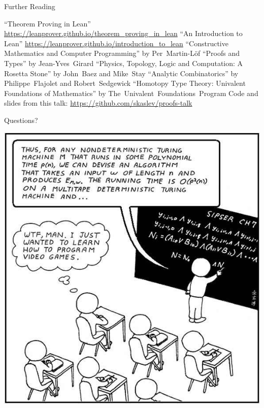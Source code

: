 \documentclass[pdf]{beamer}
\begin{document}
\begin{frame}{Further Reading}
  \small
  \begin{outline}
    \1 ``Theorem Proving in Lean'' \url{https://leanprover.github.io/theorem_proving_in_lean}
    \1 ``An Introduction to Lean'' \url{https://leanprover.github.io/introduction_to_lean}
    \1 ``Constructive Mathematics and Computer Programming'' by \mbox{Per Martin-L\"{o}f}
    \1 ``Proofs and Types'' by \mbox{Jean-Yves Girard}
    \1 ``Physics, Topology, Logic and Computation: A Rosetta Stone'' by \mbox{John Baez} and \mbox{Mike Stay}
    \1 ``Analytic Combinatorics'' by \mbox{Philippe Flajolet} and \mbox{Robert Sedgewick}
    \1 ``Homotopy Type Theory: Univalent Foundations of Mathematics'' by \mbox{The Univalent Foundations Program}
    \1 Code and slides from this talk: \url{https://github.com/skaslev/proofs-talk}
  \end{outline}
\end{frame}

\begin{frame}{Questions?}
  \begin{center}
    \includegraphics[scale=0.32]{images/video-games}
  \end{center}
\end{frame}
\end{document}
